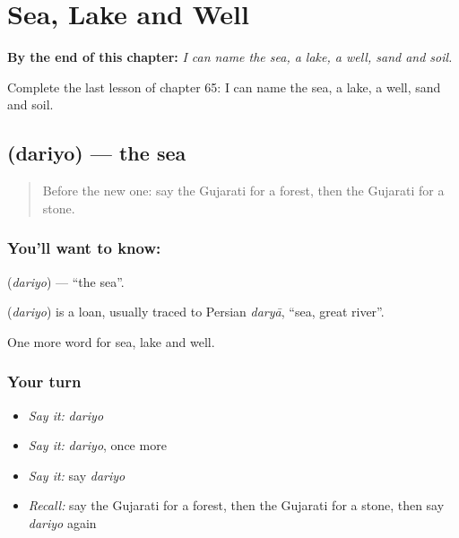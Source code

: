 
\chapter{Sea, Lake and Well}
\label{ch:gu-sea-lake-and-well}

\begin{chapteropening}
\textbf{By the end of this chapter:} \emph{I can name the sea, a lake, a well, sand and soil.}

Complete the last lesson of chapter 65: I can name the sea, a lake, a well, sand and soil.
\end{chapteropening}

\section[\texorpdfstring{\gu{દરિયો} (dariyo)}{દરિયો (dariyo)}]{ (dariyo) — the sea}

\label{lesson:GU-C65-sea}



\begin{quote}
Before the new one: say the Gujarati for a forest, then the Gujarati for a stone.
\end{quote}

\subsection*{You'll want to know: }
\textbf{} (\emph{dariyo}) — \textquotedblleft{}the sea\textquotedblright{}.

\begin{cousinweb}
\textbf{} (\emph{dariyo}) is a loan, usually traced to Persian \emph{daryā}, \textquotedblleft{}sea, great river\textquotedblright{}.
\end{cousinweb}

\begin{grammarlens}[title={What you've built}]
One more word for sea, lake and well.
\end{grammarlens}

\subsection*{Your turn}
\begin{itemize}
\raggedright
  \item \emph{Say it:} \emph{dariyo}
  \item \emph{Say it:} \emph{dariyo}, once more
  \item \emph{Say it:} say \emph{dariyo}
  \item \emph{Recall:} say the Gujarati for a forest, then the Gujarati for a stone, then say \emph{dariyo} again
\end{itemize}

